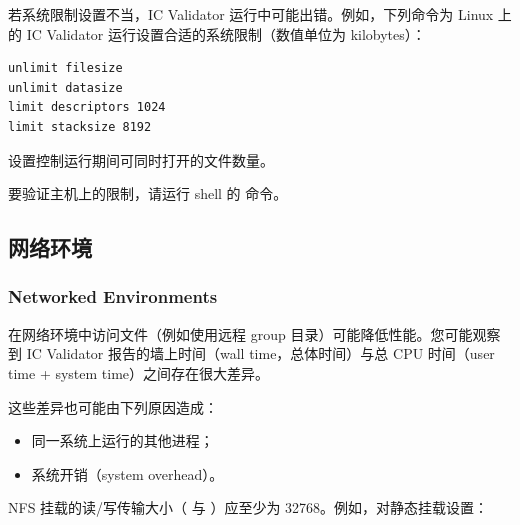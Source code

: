 若系统限制设置不当，IC Validator 运行中可能出错。例如，下列命令为 Linux 上的 IC Validator 运行设置合适的系统限制（数值单位为 kilobytes）：
\begin{lstlisting}[style=shell]
unlimit filesize
unlimit datasize
limit descriptors 1024
limit stacksize 8192
\end{lstlisting}

\begin{noteBox}
 设置控制运行期间可同时打开的文件数量。
\end{noteBox}

要验证主机上的限制，请运行 shell 的  命令。

\subsection{网络环境}
\subsubsection*{Networked Environments}

在网络环境中访问文件（例如使用远程 group 目录）可能降低性能。您可能观察到 IC Validator 报告的墙上时间（wall time，总体时间）与总 CPU 时间（user time + system time）之间存在很大差异。

\begin{noteBox}
这些差异也可能由下列原因造成：
\begin{itemize}
  \item 同一系统上运行的其他进程；
  \item 系统开销（system overhead）。
\end{itemize}
\end{noteBox}

NFS 挂载的读/写传输大小（ 与 ）应至少为 32768。例如，对静态挂载设置：
\begin{lstlisting}[style=shell]
% mount -t nfs -o rsize=32768,wsize=32768 server:/path /mnt/nfs
\end{lstlisting}
